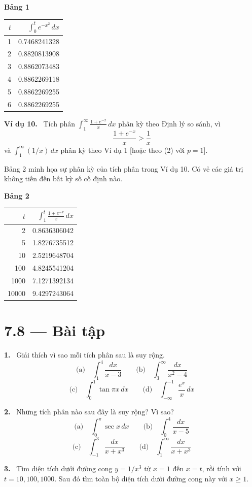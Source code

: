 \documentclass[12pt,a4paper]{article}
\newcommand{\ex}[1]{\par\medskip\noindent\textbf{Ví dụ #1.}\ }
\newcommand{\bt}[1]{\par\smallskip\Needspace{5\baselineskip}\noindent\textbf{#1.}\ }
\begin{document}
\textbf{Bảng 1}
\begin{center}\begin{tabular}{r r}\toprule
$t$&$\displaystyle\int_0^t e^{-x^2}\,dx$\\\midrule
1&0.7468241328\\2&0.8820813908\\3&0.8862073483\\4&0.8862269118\\5&0.8862269255\\6&0.8862269255\\\bottomrule
\end{tabular}\end{center}

\ex{10} Tích phân $\displaystyle\int_1^\infty\frac{1+e^{-x}}x\,dx$ phân kỳ theo Định lý so sánh, vì
\[\frac{1+e^{-x}}x>\frac1x\]
và $\int_1^\infty(1/x)\,dx$ phân kỳ theo Ví dụ 1 [hoặc theo (2) với $p=1$].

Bảng 2 minh họa sự phân kỳ của tích phân trong Ví dụ 10. Có vẻ các giá trị không tiến đến bất kỳ số cố định nào.

\textbf{Bảng 2}
\begin{center}\begin{tabular}{r r}\toprule
$t$&$\displaystyle\int_1^t\frac{1+e^{-x}}x\,dx$\\\midrule
2&0.8636306042\\5&1.8276735512\\10&2.5219648704\\100&4.8245541204\\1000&7.1271392134\\10000&9.4297243064\\\bottomrule
\end{tabular}\end{center}
\section*{7.8 — Bài tập}
\bt{1} Giải thích vì sao mỗi tích phân sau là suy rộng.
\[\text{(a)}\quad\int_1^4\frac{dx}{x-3}\qquad
\text{(b)}\quad\int_3^\infty\frac{dx}{x^2-4}\]
\[\text{(c)}\quad\int_0^1\tan\pi x\,dx\qquad
\text{(d)}\quad\int_{-\infty}^{-1}\frac{e^x}x\,dx\]
\bt{2} Những tích phân nào sau đây là suy rộng? Vì sao?
\[\text{(a)}\quad\int_0^\pi\sec x\,dx\qquad
\text{(b)}\quad\int_0^4\frac{dx}{x-5}\]
\[\text{(c)}\quad\int_{-1}^3\frac{dx}{x+x^3}\qquad
\text{(d)}\quad\int_1^\infty\frac{dx}{x+x^3}\]
\bt{3} Tìm diện tích dưới đường cong $y=1/x^3$ từ $x=1$ đến $x=t$, rồi tính với $t=10,100,1000$. Sau đó tìm toàn bộ diện tích dưới đường cong này với $x\ge1$.
\end{document}
